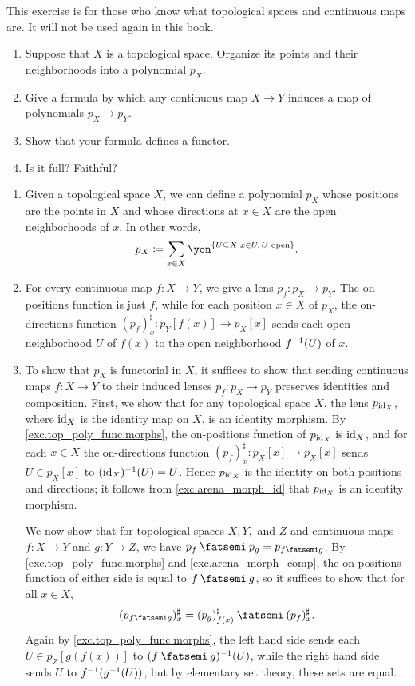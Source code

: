 \documentclass[Book-Poly]{subfiles}
\begin{document}
\begin{exercise} \label{exc.top_poly_func}
This exercise is for those who know what topological spaces and continuous maps are. It will not be used again in this book.
\begin{enumerate}
	\item Suppose that $X$ is a topological space. Organize its points and their neighborhoods into a polynomial $p_X$.
	\item Give a formula by which any continuous map $X\to Y$ induces a map of polynomials $p_X\to p_Y$.
	\item Show that your formula defines a functor.
	\item Is it full? Faithful?
\qedhere
\end{enumerate}
\begin{solution}
\begin{enumerate}
	\item Given a topological space $X$, we can define a polynomial $p_X$ whose positions are the points in $X$ and whose directions at $x \in X$ are the open neighborhoods of $x$.
	In other words,
	\[
	    p_X \coloneqq \sum_{x \in X} \yon^{\{ U \ss X \mid x \in U, \, U \text{ open} \}}.
	\]
	\item \label{exc.top_poly_func.morphs} For every continuous map $f \colon X \to Y$, we give a lens $p_f \colon p_X \to p_Y$.
	The on-positions function is just $f$, while for each position $x \in X$ of $p_X$, the on-directions function $(p_f)^\sharp_x \colon p_Y[f(x)] \to p_X[x]$ sends each open neighborhood $U$ of $f(x)$ to the open neighborhood $f^{-1}(U)$ of $x$.
	
	\item To show that $p_X$ is functorial in $X$, it suffices to show that sending continuous maps $f \colon X \to Y$ to their induced lenses $p_f \colon p_X \to p_Y$ preserves identities and composition.
	First, we show that for any topological space $X$, the lens $p_{\mathrm{id}_X}$, where $\mathrm{id}_X$ is the identity map on $X$, is an identity morphism.
	By \cref{exc.top_poly_func.morphs}, the on-positions function of $p_{\mathrm{id}_X}$ is $\mathrm{id}_X$, and for each $x \in X$ the on-directions function $(p_f)^\sharp_x \colon p_X[x] \to p_X[x]$ sends $U \in p_X[x]$ to $(\mathrm{id}_X)^{-1}(U) = U$.
	Hence $p_{\mathrm{id}_X}$ is the identity on both positions and directions; it follows from \cref{exc.arena_morph_id} that $p_{\mathrm{id}_X}$ is an identity morphism.
	
	We now show that for topological spaces $X,Y,$ and $Z$ and continuous maps $f \colon X \to Y$ and $g \colon Y \to Z$, we have $p_f \then p_g = p_{f \then g}$.
	By \cref{exc.top_poly_func.morphs} and \cref{exc.arena_morph_comp}, the on-positions function of either side is equal to $f \then g$, so it suffices to show that for all $x \in X$,
	\[
	    (p_{f \then g})^\sharp_x = (p_g)^\sharp_{f(x)} \then (p_f)^\sharp_x.
	\]
	Again by \cref{exc.top_poly_func.morphs}, the left hand side sends each $U \in p_Z[g(f(x))]$ to $(f \then g)\inv(U)$, while the right hand side sends $U$ to $f^{-1}(g^{-1}(U))$, but by elementary set theory, these sets are equal.
	

\end{enumerate}
\end{solution}
\end{exercise}
\end{document}

